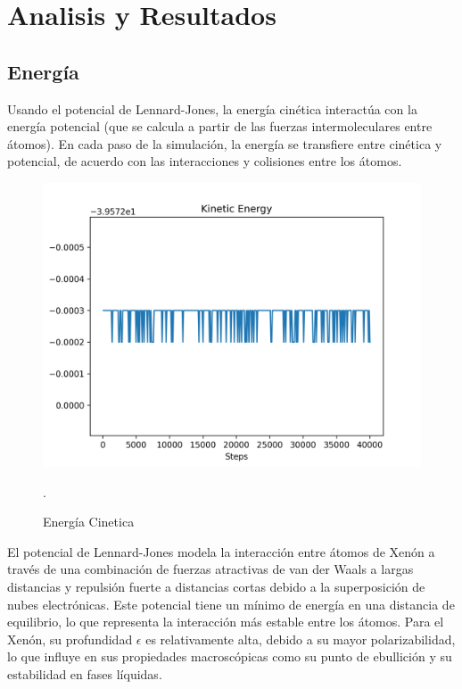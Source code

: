 \documentclass[10pt,letterpaper,twocolumn]{article}
\begin{document}
\section*{Analisis y Resultados}

\subsection*{Energía}

Usando el potencial de Lennard-Jones, la energía cinética interactúa con la energía 
potencial (que se calcula a partir de las fuerzas intermoleculares entre átomos).
 En cada paso de la simulación, la energía se transfiere entre cinética y potencial,
  de acuerdo con las interacciones y colisiones entre los átomos.

\begin{figure}[h]
	\centering
	\includegraphics[scale=0.50]{energia1.png}
	\caption{Energía Cinetica}.
\end{figure}

El potencial de Lennard-Jones modela la interacción entre átomos de Xenón a
través de una combinación de fuerzas atractivas de van der Waals a largas
distancias y repulsión fuerte a distancias cortas debido a la superposición
de nubes electrónicas. Este potencial tiene un mínimo de energía en una distancia 
de equilibrio, lo que representa la interacción más estable entre los átomos. Para 
el Xenón, su profundidad $\epsilon$ es relativamente alta, debido a su mayor 
polarizabilidad, lo que influye en sus propiedades macroscópicas como su punto 
de ebullición y su estabilidad en fases líquidas.
\end{document}
